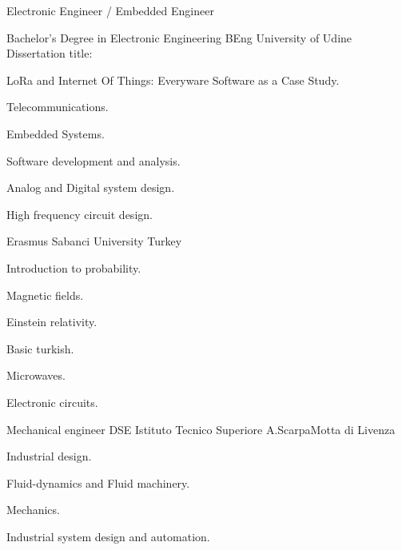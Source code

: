 \documentclass[english,a4paper]{europasscv}
\begin{document}
	\begin{europasscv}

	\ecvpersonalinfo
	 {
		Electronic Engineer / Embedded Engineer
	}



		 {
			Bachelor's Degree in Electronic Engineering
		}{BEng}
		\ecvitem{} {
			University of Udine
		}
		\ecvitem{} {
			\textcolor{ecvhighlightcolor}{Dissertation title}:
		}
		\begin{center} {
				LoRa and Internet Of Things: \linebreak
				Everyware Software as a Case Study.
		}
		\end{center}
		\ecvitem{} {
			\begin{ecvitemize}
				\item Telecommunications.
				\item Embedded Systems.
				\item Software development and analysis.
				\item Analog and Digital system design.
				\item High frequency circuit design.
			\end{ecvitemize}
		}

		 {
			Erasmus
		}
		\ecvitem{} {
			Sabanci University Turkey
		}
		\ecvitem{} {
			\begin{ecvitemize}
				\item Introduction to probability.
				\item Magnetic fields.
				\item Einstein relativity.
				\item Basic turkish.
				\item Microwaves.
				\item Electronic circuits.
			\end{ecvitemize}
		}

		 {
			Mechanical engineer
		}{DSE}
		\ecvitem{} {
			Istituto Tecnico Superiore A.Scarpa\newline Motta di Livenza
		}
		\ecvitem{} {
			\begin{ecvitemize}
				\item Industrial design.
				\item Fluid-dynamics and Fluid machinery.
				\item Mechanics.
				\item Industrial system design and automation.
			\end{ecvitemize}
		}


\end{europasscv}
\end{document}
